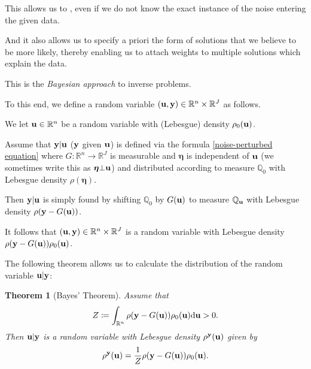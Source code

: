 \documentclass[oneside,11pt]{book}
\numberwithin{equation}{section}
\newtheorem{theorem}{Theorem}[section]
\begin{document}
This allows us to , even if we do not know the exact instance of the noise entering the given data.

And it also allows us to specify a priori the form of solutions that we believe to be more likely, thereby enabling us to attach weights to multiple solutions which explain the data.

This is the \textit{Bayesian approach} to inverse problems.

%
To this end, we define a random variable $({\bf u},{\bf y})\in\mathbb{R}^n\times\mathbb{R}^J$ as follows.

We let ${\bf u}\in\mathbb{R}^n$ be a random variable with (Lebesgue) density $\rho_0({\bf u})$.

Assume that ${\bf y}|{\bf u}$ (${\bf y}$ given ${\bf u}$) is defined via the formula \eqref{noise-perturbed equation} where $G:\mathbb{R}^n\to\mathbb{R}^J$ is measurable and $\boldsymbol{\eta}$ is independent of ${\bf u}$ (we sometimes write this as $\boldsymbol{\eta}\bot{\bf u}$) and distributed according to measure $\mathbb{Q}_0$ with Lebesgue density $\rho(\boldsymbol{\eta})$.

Then ${\bf y}|{\bf u}$ is simply found by shifting $\mathbb{Q}_0$ by $G({\bf u})$ to measure $\mathbb{Q}_{\bf u}$ with Lebesgue density $\rho({\bf y} - G({\bf u}))$.

It follows that $({\bf u},{\bf y})\in\mathbb{R}^n\times\mathbb{R}^J$ is a random variable with Lebesgue density $\rho({\bf y} - G({\bf u}))\rho_0({\bf u})$.

%
The following theorem allows us to calculate the distribution of the random variable ${\bf u}|{\bf y}$:

\begin{theorem}[Bayes' Theorem]
    \label{Bayes' theorem}
    Assume that
    \begin{align*}
        Z\coloneqq\int_{\mathbb{R}^n} \rho({\bf y} - G({\bf u}))\rho_0({\bf u}){\rm d}{\bf u} > 0.
    \end{align*}
    Then ${\bf u}|{\bf y}$ is a random variable with Lebesgue density $\rho^{\bf y}({\bf u})$ given by
    \begin{align*}
        \rho^{\bf y}({\bf u}) = \frac{1}{Z}\rho({\bf y} - G({\bf u}))\rho_0({\bf u}).
    \end{align*}
\end{theorem}
\end{document}
